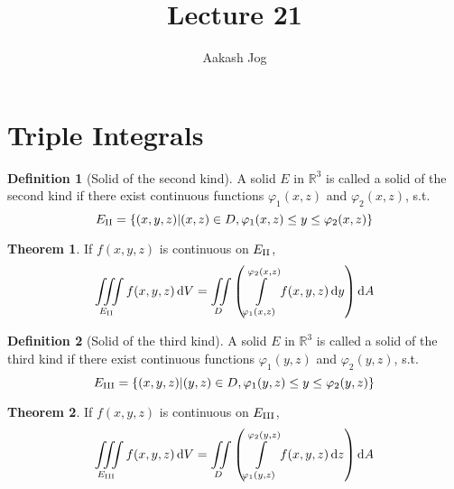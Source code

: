 \documentclass[fleqn, a4paper, 12pt]{article}
\title{Lecture 21}
\author{Aakash Jog}
\date{\formatdate{8}{1}{2015}}
\theoremstyle{definition}
\newtheorem{definition}{Definition}
\theoremstyle{theorem}
\newtheorem{theorem}{Theorem}
\theoremstyle{remark}
\begin{document}
	
\maketitle

\tableofcontents

\newpage

\section{Triple Integrals}

\begin{definition}[Solid of the second kind]
	A solid $E$ in $\mathbb{R}^3$ is called a solid of the second kind if there exist continuous functions $\varphi_1(x,z)$ and $\varphi_2(x,z)$, s.t.
	\begin{equation*}
		E_{\textnormal{II}} = \{(x,y,z) | (x,z) \in D, \varphi_1(x,z) \leq y \leq \varphi_2(x,z)\}
	\end{equation*}
\end{definition}

\begin{theorem}
	If $f(x,y,z)$ is continuous on $E_{\textnormal{II}}$,
	\begin{equation*}
		\iiint\limits_{E_{\textnormal{II}}} f(x,y,z) \dif V = \iint\limits_{D} \left( \int\limits_{\varphi_1(x,z)}^{\varphi_2(x,z)} f(x,y,z) \dif y \right) \dif A
	\end{equation*}
\end{theorem}

\begin{definition}[Solid of the third kind]
	A solid $E$ in $\mathbb{R}^3$ is called a solid of the third kind if there exist continuous functions $\varphi_1(y,z)$ and $\varphi_2(y,z)$, s.t.
	\begin{equation*}
	E_{\textnormal{III}} = \{(x,y,z) | (y,z) \in D, \varphi_1(y,z) \leq y \leq \varphi_2(y,z)\}
	\end{equation*}
\end{definition}

\begin{theorem}
	If $f(x,y,z)$ is continuous on $E_{\textnormal{III}}$,
	\begin{equation*}
	\iiint\limits_{E_{\textnormal{III}}} f(x,y,z) \dif V = \iint\limits_{D} \left( \int\limits_{\varphi_1(y,z)}^{\varphi_2(y,z)} f(x,y,z) \dif z \right) \dif A
	\end{equation*}
\end{theorem}
\end{document}
